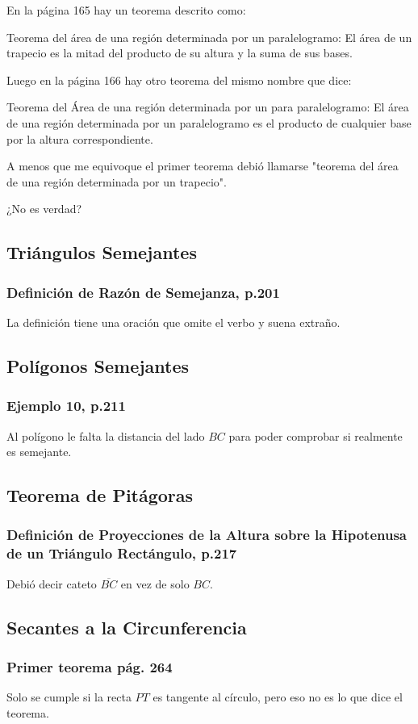 En la página 165 hay un teorema descrito como:

Teorema del área de una región determinada por un paralelogramo:
El área de un trapecio es la mitad del producto de su altura y la suma de sus bases.

Luego en la página 166 hay otro teorema del mismo nombre que dice:

Teorema del Área de una región determinada por un para paralelogramo:
El área de una región determinada por un paralelogramo es el producto de cualquier base por la altura correspondiente.

A menos que me equivoque el primer teorema debió llamarse "teorema del área de una región determinada por un trapecio".

¿No es verdad?

\subsection{Triángulos Semejantes}
\subsubsection{Definición de Razón de Semejanza, p.201}

La definición tiene una oración que omite el verbo y suena extraño.


\subsection{Polígonos Semejantes}
\subsubsection{Ejemplo 10, p.211}

Al polígono le falta la distancia del lado \(BC\) para poder comprobar si realmente es semejante.

\subsection{Teorema de Pitágoras}
\subsubsection{Definición de Proyecciones de la Altura sobre la Hipotenusa de un Triángulo Rectángulo, p.217}

Debió decir cateto \(\overline{BC}\) en vez de solo \(BC\).

\subsection{Secantes a la Circunferencia}
\subsubsection{Primer teorema pág. 264}

Solo se cumple si la recta $PT$ es tangente al círculo, pero eso no es lo que dice el teorema.

